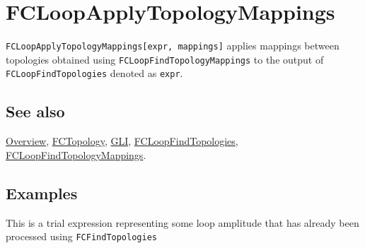 \documentclass[../FeynCalcManual.tex]{subfiles}
\begin{document}
\hypertarget{fcloopapplytopologymappings}{%
\section{FCLoopApplyTopologyMappings}\label{fcloopapplytopologymappings}}

\texttt{FCLoopApplyTopologyMappings[\allowbreak{}expr,\ \allowbreak{}mappings]}
applies mappings between topologies obtained using
\texttt{FCLoopFindTopologyMappings} to the output of
\texttt{FCLoopFindTopologies} denoted as \texttt{expr}.

\subsection{See also}

\hyperlink{toc}{Overview}, \hyperlink{fctopology}{FCTopology},
\hyperlink{gli}{GLI},
\hyperlink{fcloopfindtopologies}{FCLoopFindTopologies},
\hyperlink{fcloopfindtopologymappings}{FCLoopFindTopologyMappings}.

\subsection{Examples}

This is a trial expression representing some loop amplitude that has
already been processed using \texttt{FCFindTopologies}
\end{document}

